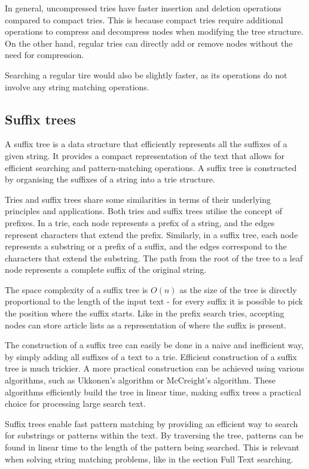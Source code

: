 In general, uncompressed tries have faster insertion and deletion operations compared to compact tries. This is because compact tries require additional operations to compress and decompress nodes when modifying the tree structure. On the other hand, regular tries can directly add or remove nodes without the need for compression.

Searching a regular tire would also be slightly faster, as its operations do not involve any string matching operations.
 

\subsection{Suffix trees}\label{sec:suffixtree}
A suffix tree is a data structure that efficiently represents all the suffixes of a given string. It provides a compact representation of the text that allows for efficient searching and pattern-matching operations. A suffix tree is constructed by organising the suffixes of a string into a trie structure.

Tries and suffix trees share some similarities in terms of their underlying principles and applications. Both tries and suffix trees utilise the concept of prefixes. In a trie, each node represents a prefix of a string, and the edges represent characters that extend the prefix. Similarly, in a suffix tree, each node represents a substring or a prefix of a suffix, and the edges correspond to the characters that extend the substring. The path from the root of the tree to a leaf node represents a complete suffix of the original string.

The space complexity of a suffix tree is $O(n)$ as the size of the tree is directly proportional to the length of the input text - for every suffix it is possible to pick the position where the suffix starts. Like in the prefix search tries, accepting nodes can store article lists as a representation of where the suffix is present. 

The construction of a suffix tree can easily be done in a naive and inefficient way, by simply adding all suffixes of a text to a trie. Efficient construction of a suffix tree is much trickier. A more practical construction can be achieved using various algorithms, such as Ukkonen's algorithm or McCreight's algorithm. These algorithms efficiently build the tree in linear time, making suffix trees a practical choice for processing large search text.

Suffix trees enable fast pattern matching by providing an efficient way to search for substrings or patterns within the text. By traversing the tree, patterns can be found in linear time to the length of the pattern being searched. This is relevant when solving string matching problems, like in the section Full Text searching. 
